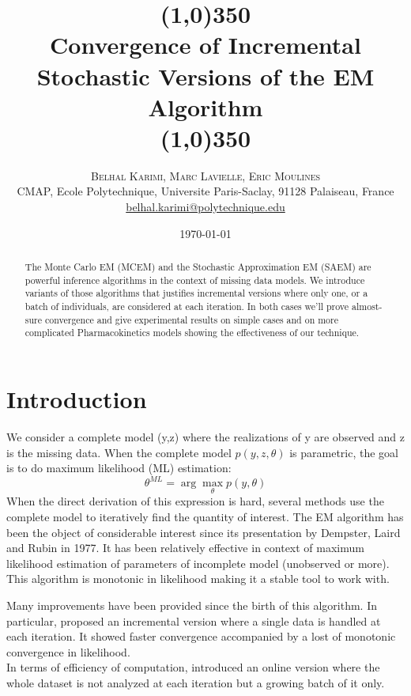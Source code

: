 \documentclass{article}
\title{\line(1,0){350}\\\myfont Convergence of Incremental Stochastic Versions of the EM Algorithm\\\line(1,0){350}}
\author{%
\textsc{Belhal Karimi, Marc Lavielle, Eric Moulines}\\
\normalsize  CMAP, Ecole Polytechnique, Universite Paris-Saclay, 91128 Palaiseau, France\\ %
\normalsize \href{mailto:belhal.karimi@polytechnique.edu}{belhal.karimi@polytechnique.edu} %
}
\date{\today} %
\theoremstyle{plain}
\theoremstyle{plain}
\theoremstyle{definition}
\begin{document}

\maketitle

\begin{abstract}
\noindent The Monte Carlo EM (MCEM) and the Stochastic Approximation EM (SAEM) are powerful inference algorithms in the context of missing data models. We introduce variants of those algorithms that justifies incremental versions where only one, or a batch of individuals, are considered at each iteration. In both cases we'll prove almost-sure convergence and give experimental results on simple cases and on more complicated Pharmacokinetics models showing the effectiveness of our technique.
\end{abstract}

\section{Introduction}
We consider a complete model (y,z) where the realizations of y are observed and z is the missing data. When the complete model $p(y,z,\theta)$ is parametric, the goal is to do maximum likelihood (ML) estimation:
\begin{equation}
\theta^{ML} = \arg\max \limits_{\theta} p(y,\theta)
\end{equation}
When the direct derivation of this expression is hard, several methods use the complete model to iteratively find the quantity of interest.
The EM algorithm has been the object of considerable interest since its presentation by Dempster, Laird and Rubin in 1977. It has been relatively effective in context of maximum likelihood estimation of parameters of incomplete model (unobserved or more). This algorithm is monotonic in likelihood making it a stable tool to work with.

Many improvements have been provided since the birth of this algorithm. In particular, \citep{neal} proposed an incremental version where a single data is handled at each iteration. It showed faster convergence accompanied by a lost of monotonic convergence in likelihood.\\
In terms of efficiency of computation, \citep{fort, cappe} introduced an online version where the whole dataset is not analyzed at each iteration but a growing batch of it only.
\end{document}
